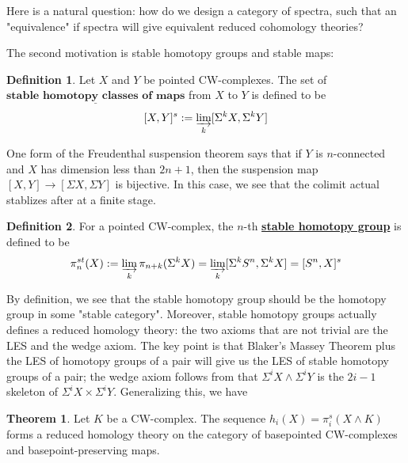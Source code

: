 \documentclass{article}
\theoremstyle{definition}
\newtheorem{theorem}{Theorem}[section]
\theoremstyle{definition}
\newtheorem{definition}{Definition}[theorem]
\theoremstyle{definition}
\theoremstyle{definition}
\theoremstyle{definition}
\theoremstyle{definition}
\theoremstyle{definition}
\begin{document}
Here is a natural question: how do we design a category of spectra, such that an "equivalence" if spectra will give equivalent reduced cohomology theories?

The second motivation is stable homotopy groups and stable maps: 


\begin{tcolorbox}[colback=purple!5!white,colframe=purple!75!black]
\begin{definition}
Let $X$ and $Y$ be pointed CW-complexes. The set of $\underline{\textbf{stable homotopy classes of maps}}$ from $X$ to $Y$ is defined to be 
\[[X,Y]^s:= \varinjlim_{k}[\Sigma^k X, \Sigma^k Y] \]
\end{definition}
\end{tcolorbox}
One form of the Freudenthal suspension theorem says that if $Y$ is $n$-connected and $X$ has dimension less than $2n+1$, then the suspension map $[X,Y]\to [\Sigma X,\Sigma Y]$ is bijective. In this case, we see that the colimit actual stablizes after at a finite stage. 

\begin{tcolorbox}[colback=purple!5!white,colframe=purple!75!black]
\begin{definition}
For a pointed CW-complex, the $n$-th \underline{\textbf{stable homotopy group}} is defined to be 
\[\pi_n^{st}(X):=\varinjlim_{k}\pi_{n+k}(\Sigma^k X)=\varinjlim_{k}[\Sigma^k S^n, \Sigma^k X]=[S^n,X]^s\]
\end{definition}
\end{tcolorbox}
By definition, we see that the stable homotopy group should be the homotopy group in some "stable category". Moreover, stable homotopy groups actually defines a reduced homology theory: the two axioms that are not trivial are the LES and the wedge axiom. The key point is that Blaker's Massey Theorem plus the LES of homotopy groups of a pair will give us the LES of stable homotopy groups of a pair; the wedge axiom follows from that $\Sigma^i X\wedge \Sigma^i Y$ is the $2i-1$ skeleton of  $\Sigma^i X\times \Sigma^i Y$. Generalizing this, we have 

\begin{tcolorbox}[colback=red!5!white,colframe=red!30!white]
\begin{theorem}
    Let $K$ be a CW-complex. The sequence $h_i(X) = \pi^s_i(X \wedge K)$ forms a reduced homology theory on the category of basepointed CW-complexes and basepoint-preserving maps.
\end{theorem}
\end{tcolorbox}
\end{document}
